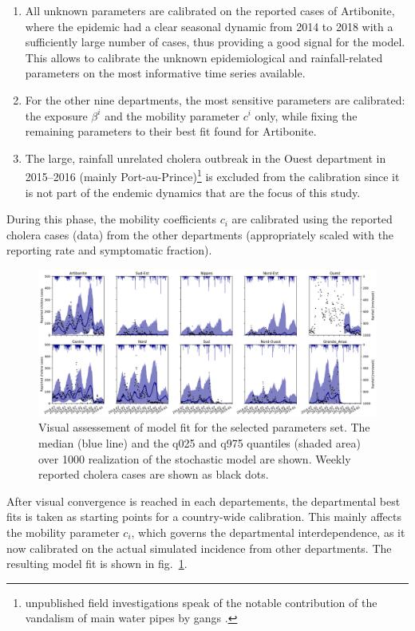 \begin{enumerate}
    \item All unknown parameters are calibrated on the reported cases of Artibonite, where the epidemic had a clear seasonal dynamic from 2014 to 2018 with a sufficiently large number of cases, thus providing a good signal for the model.  This allows to calibrate the unknown epidemiological and rainfall-related parameters on the most informative time series available.
    \item For the other nine departments, the most sensitive parameters are calibrated: the exposure $\beta^i$ and the mobility parameter $c^i$ only, while fixing the remaining parameters to their best fit found for Artibonite.
    \item The large, rainfall unrelated cholera outbreak in the Ouest department in 2015--2016 (mainly Port-au-Prince)\footnote{unpublished field investigations speak of the notable contribution of the vandalism of main water pipes by gangs \parencite{Rebaudet:NationalAlertresponseStrategy:2018}.} is excluded from the calibration since it is not part of the endemic dynamics that are the focus of  this study.
\end{enumerate}

During this phase, the mobility coefficients $c_i$ are calibrated using the reported cholera cases (data) from the other departments (appropriately scaled with the reporting rate and symptomatic fraction).
\begin{figure}[htbp]
\begin{center}
\includegraphics[width=1.0\textwidth]{fig_cholera-haiti-ocv/fit.png}
\caption[Visual assessement of model fit for the selected parameters set]{Visual assessement of model fit for the selected parameters set. The median (blue line) and the q025 and q975 quantiles (shaded area) over 1000 realization of the stochastic model are shown. Weekly reported cholera cases are shown as black dots.}
\label{fitEPFL}
\end{center}
\end{figure}
After visual convergence is reached in each departements, the departmental best fits is taken as starting points for a country-wide calibration. This mainly affects the mobility parameter $c_i$, which governs the departmental interdependence, as it now calibrated on the actual simulated incidence from other departments. The resulting model fit is shown in fig.~\ref{fitEPFL}. 

